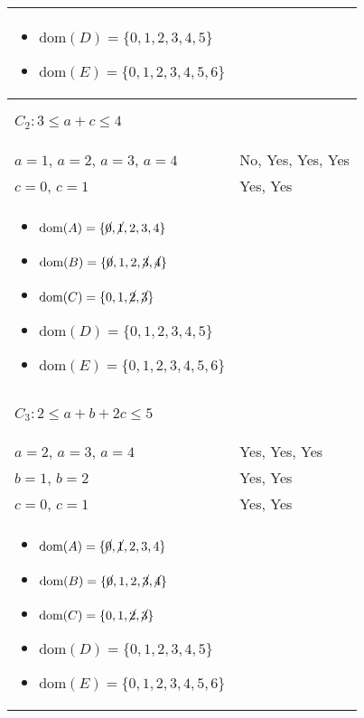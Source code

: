\begin{example}
\begin{center}
\begin{tabular}{ll}
{\begin{itemize}
                \item $\text{dom}(D) = \{0, 1, 2, 3, 4, 5\} $
                \item $\text{dom}(E) = \{0, 1, 2, 3, 4, 5, 6\} $
            \end{itemize}} \\
            \midrule
            \multicolumn{2}{p{\linewidth}}{
            \begin{center}
                $C_2: 3 \leq a + c \leq 4$
            \end{center}} \\
            \midrule
                $a=1$, $a=2$, $a=3$, $a=4$ & No, Yes, Yes, Yes \\
                $c=0$, $c=1$ & Yes, Yes \\
            \multicolumn{2}{p{\linewidth}}{
            \begin{itemize}
                \item $\text{dom}(A) = \{\cancel{0}, \cancel{1}, 2, 3, 4\}$
                \item $\text{dom}(B) = \{\cancel{0}, 1, 2, \cancel{3}, \cancel{4}\} $
                \item $\text{dom}(C) = \{0, 1, \cancel{2}, \cancel{3}\} $
                \item $\text{dom}(D) = \{0, 1, 2, 3, 4, 5\} $
                \item $\text{dom}(E) = \{0, 1, 2, 3, 4, 5, 6\} $
            \end{itemize}} \\
            \midrule
            \multicolumn{2}{p{\linewidth}}{
            \begin{center}
                $C_3: 2 \leq a + b + 2c \leq 5$
            \end{center}} \\
            \midrule
                $a=2$, $a=3$, $a=4$ & Yes, Yes, Yes \\
                $b=1$, $b=2$ & Yes, Yes \\
                $c=0$, $c=1$ & Yes, Yes \\
            \multicolumn{2}{p{\linewidth}}{
            \begin{itemize}
                \item $\text{dom}(A) = \{\cancel{0}, \cancel{1}, 2, 3, 4\}$
                \item $\text{dom}(B) = \{\cancel{0}, 1, 2, \cancel{3}, \cancel{4}\} $
                \item $\text{dom}(C) = \{0, 1, \cancel{2}, \cancel{3}\} $
                \item $\text{dom}(D) = \{0, 1, 2, 3, 4, 5\} $
                \item $\text{dom}(E) = \{0, 1, 2, 3, 4, 5, 6\} $
            \end{itemize}} \\
            \bottomrule
        \end{tabular}
    \end{center}
\end{example}
\newpage


